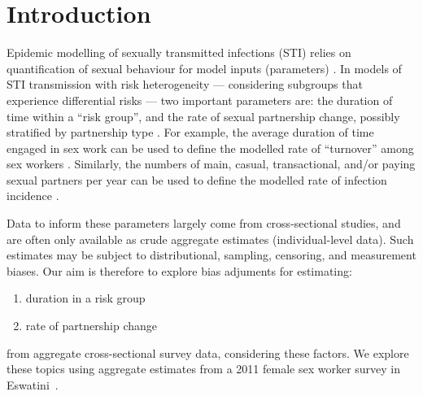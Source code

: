 \section{Introduction}
Epidemic modelling of sexually transmitted infections (STI) relies on
quantification of sexual behaviour for model inputs (parameters) \cite{Garnett2002}.
In models of STI transmission with risk heterogeneity
--- \ie considering subgroups that experience differential risks ---
two important parameters are:
the duration of time within a ``risk group'', and
the rate of sexual partnership change, possibly stratified by partnership type
\cite{Garnett1996,Stigum1997,Watts2010,Knight2020}.
For example, the average duration of time engaged in sex work
can be used to define the modelled rate of ``turnover'' among sex workers \cite{Watts2010}.
Similarly, the numbers of main, casual, transactional, and/or paying sexual partners per year
can be used to define the modelled rate of infection incidence \cite{Boily2015}.
\par
Data to inform these parameters largely come from cross-sectional studies,
and are often only available as crude aggregate estimates (\vs individual-level data).
Such estimates may be subject to distributional, sampling, censoring, and measurement biases.
Our aim is therefore to explore bias adjuments for estimating:
\begin{enumerate}
  \item duration in a risk group
  \item rate of partnership change
\end{enumerate}
from aggregate cross-sectional survey data, considering these factors.
We explore these topics using aggregate estimates from
a 2011 female sex worker survey in Eswatini~\cite{Baral2014}.
